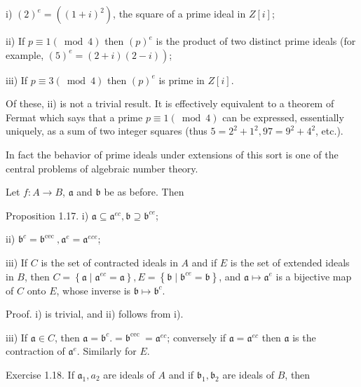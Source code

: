 \documentclass{standalone}
\theoremstyle{definition}
\theoremstyle{remark}
\begin{document}
i) $(2)^{e}=\left((1+i)^{2}\right)$, the square of a prime ideal in $Z[i]$;

ii) If $p \equiv 1(\bmod 4)$ then $(p)^{e}$ is the product of two distinct prime ideals (for example, $\left.(5)^{e}=(2+i)(2-i)\right)$;

iii) If $p \equiv 3(\bmod 4)$ then $(p)^{e}$ is prime in $Z[i]$.

Of these, ii) is not a trivial result. It is effectively equivalent to a theorem of Fermat which says that a prime $p \equiv 1(\bmod 4)$ can be expressed, essentially uniquely, as a sum of two integer squares (thus $5=2^{2}+1^{2}, 97=9^{2}+4^{2}$, etc.).

In fact the behavior of prime ideals under extensions of this sort is one of the central problems of algebraic number theory.

Let $f: A \rightarrow B$, $\mathfrak{a}$ and $\mathfrak{b}$ be as before. Then

Proposition 1.17. i) $\mathfrak{a} \subseteq \mathfrak{a}^{e c}, \mathfrak{b} \supseteq \mathfrak{b}^{c e}$;

ii) $\mathfrak{b}^{c}=\mathfrak{b}^{\text {cec }}, \mathfrak{a}^{e}=\mathfrak{a}^{e c e}$;

iii) If $C$ is the set of contracted ideals in $A$ and if $E$ is the set of extended ideals in $B$, then $C=\left\{\mathfrak{a} \mid \mathfrak{a}^{e c}=\mathfrak{a}\right\}, E=\left\{\mathfrak{b} \mid \mathfrak{b}^{c e}=\mathfrak{b}\right\}$, and $\mathfrak{a} \mapsto \mathfrak{a}^{e}$ is a bijective map of $C$ onto $E$, whose inverse is $\mathfrak{b} \mapsto \mathfrak{b}^{c}$.

Proof. i) is trivial, and ii) follows from i).

iii) If $\mathfrak{a} \in C$, then $\mathfrak{a}=\mathfrak{b}^{c} .=\mathfrak{b}^{\text {cec }}=\mathfrak{a}^{e c}$; conversely if $\mathfrak{a}=\mathfrak{a}^{e c}$ then $\mathfrak{a}$ is the contraction of $\mathfrak{a}^{e}$. Similarly for $E$.

Exercise 1.18. If $\mathfrak{a}_{1}, a_{2}$ are ideals of $A$ and if $\mathfrak{b}_{1}, \mathfrak{b}_{2}$ are ideals of $B$, then
\end{document}
